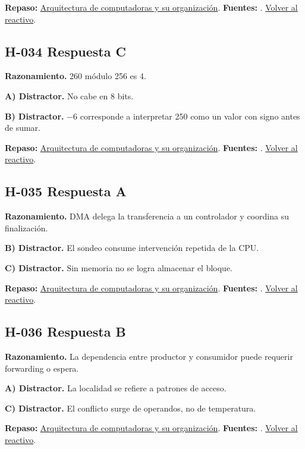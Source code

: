 \textbf{Repaso:} \hyperref[sec:h2]{Arquitectura de computadoras y su organización}. \textbf{Fuentes:} \cite{intel,architecture}. \hyperref[q:H-033]{Volver al reactivo}.\par\medskip

\subsection*{H-034 \quad Respuesta C}\label{s:H-034}
\textbf{Razonamiento.} 260 módulo 256 es 4.

\textbf{A) Distractor. }No cabe en 8 bits.

\textbf{B) Distractor. }−6 corresponde a interpretar 250 como un valor con signo antes de sumar.

\textbf{Repaso:} \hyperref[sec:h2]{Arquitectura de computadoras y su organización}. \textbf{Fuentes:} \cite{intel,architecture}. \hyperref[q:H-034]{Volver al reactivo}.\par\medskip

\subsection*{H-035 \quad Respuesta A}\label{s:H-035}
\textbf{Razonamiento.} DMA delega la transferencia a un controlador y coordina su finalización.

\textbf{B) Distractor. }El sondeo consume intervención repetida de la CPU.

\textbf{C) Distractor. }Sin memoria no se logra almacenar el bloque.

\textbf{Repaso:} \hyperref[sec:h2]{Arquitectura de computadoras y su organización}. \textbf{Fuentes:} \cite{intel,architecture}. \hyperref[q:H-035]{Volver al reactivo}.\par\medskip

\subsection*{H-036 \quad Respuesta B}\label{s:H-036}
\textbf{Razonamiento.} La dependencia entre productor y consumidor puede requerir forwarding o espera.

\textbf{A) Distractor. }La localidad se refiere a patrones de acceso.

\textbf{C) Distractor. }El conflicto surge de operandos, no de temperatura.

\textbf{Repaso:} \hyperref[sec:h2]{Arquitectura de computadoras y su organización}. \textbf{Fuentes:} \cite{intel,architecture}. \hyperref[q:H-036]{Volver al reactivo}.\par\medskip

